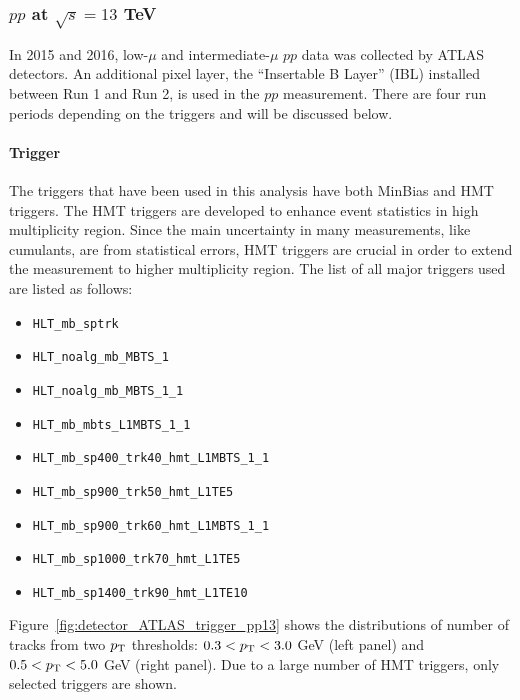 \subsubsection{$pp$ at $\sqrt{s}=13$ TeV}

In 2015 and 2016, low-$\mu$ and intermediate-$\mu$ $pp$ data was collected by ATLAS detectors. An additional pixel layer, the ``Insertable B Layer'' (IBL) installed between Run 1 and Run 2, is used in the $pp$ measurement. There are four run periods depending on the triggers and will be discussed below.



\paragraph{Trigger}

The triggers that have been used in this analysis have both MinBias and HMT triggers. The HMT triggers are developed to enhance event statistics in high multiplicity region. Since the main uncertainty in many measurements, like cumulants, are from statistical errors, HMT triggers are crucial in order to extend the measurement to higher multiplicity region. The list of all major triggers used are listed as follows:
\begin{itemize}
\item \verb|HLT_mb_sptrk|
\item \verb|HLT_noalg_mb_MBTS_1|
\item \verb|HLT_noalg_mb_MBTS_1_1|
\item \verb|HLT_mb_mbts_L1MBTS_1_1|
\item \verb|HLT_mb_sp400_trk40_hmt_L1MBTS_1_1|
\item \verb|HLT_mb_sp900_trk50_hmt_L1TE5|
\item \verb|HLT_mb_sp900_trk60_hmt_L1MBTS_1_1|
\item \verb|HLT_mb_sp1000_trk70_hmt_L1TE5|
\item \verb|HLT_mb_sp1400_trk90_hmt_L1TE10|
\end{itemize}

Figure~\ref{fig:detector_ATLAS_trigger_pp13} shows the distributions of number of tracks from two $p_\text{T}$ thresholds: $0.3<p_\text{T}<3.0$ GeV (left panel) and $0.5<p_\text{T}<5.0$ GeV (right panel). Due to a large number of HMT triggers, only selected triggers are shown.

